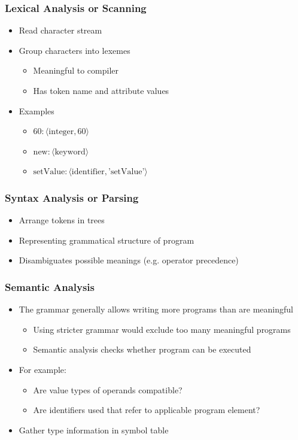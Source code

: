 \documentclass{scrartcl}
\begin{document}
\subsubsection{Lexical Analysis or Scanning}

\begin{itemize}
	\item Read character stream
	\item Group characters into lexemes
	\begin{itemize}
		\item Meaningful to compiler
		\item Has token name and attribute values
	\end{itemize}
	\item Examples
	\begin{itemize}
		\item $ 60: \langle \text{integer}, 60 \rangle $
		\item $ \text{new}: \langle \text{keyword} \rangle $
		\item $ \text{setValue}: \langle \text{identifier},\text{'setValue'} \rangle $
	\end{itemize}
\end{itemize}

\subsubsection{Syntax Analysis or Parsing}

\begin{itemize}
	\item Arrange tokens in trees
	\item Representing grammatical structure of program
	\item Disambiguates possible meanings (e.g. operator precedence)
\end{itemize}

\subsubsection{Semantic Analysis}

\begin{itemize}
	\item The grammar generally allows writing more programs than are meaningful
	\begin{itemize}
		\item Using stricter grammar would exclude too many meaningful programs
		\item Semantic analysis checks whether program can be executed
	\end{itemize}
	\item For example:
	\begin{itemize}
		\item Are value types of operands compatible?
		\item Are identifiers used that refer to applicable program element?
	\end{itemize}
	\item Gather type information in symbol table
\end{itemize}
\end{document}
